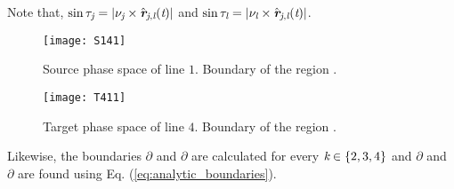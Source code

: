  Note that,  $\sin{\tau_{\textit{\textit{j}}}} = |\nu_{\textit{\textit{j}}}\times \hat{\textit{\textbf{r}}}_{\textit{\textit{j}}, \textit{\textit{l}}}(\textit{t})|$ and $\sin{\tau_{\textit{\textit{l}}}} = |\nu_{\textit{\textit{l}}}\times \hat{\textit{\textbf{r}}}_{\textit{\textit{j}}, \textit{\textit{l}}}(\textit{t})|$.
 \begin{figure}
 \begin{minipage}[]{.5\textwidth}
   \centering
   \texttt{[image: S141]}
   \caption{Source phase space of line $1$.
   Boundary of the region .}
   \label{fig:S14}
 \end{minipage}
  \begin{minipage}[]{0.5\textwidth}
  \centering
   \texttt{[image: T411]}
   \caption{Target phase space of line $4$.
    Boundary of the region .}
    \label{fig:T411}
 \end{minipage}
 \end{figure}
 Likewise, the boundaries $\partial$ and
 $\partial$ are calculated for every $\textit{\textit{k}}\in\{2,3,4\}$ and $\partial$ and $\partial$ are found using Eq. (\ref{eq:analytic_boundaries}). \\
